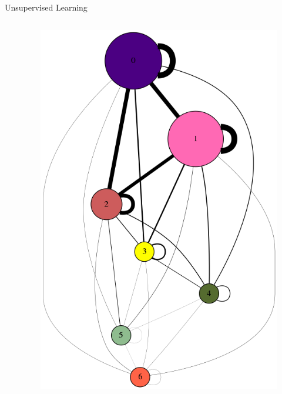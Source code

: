 \begin{frame}[t]{Unsupervised Learning}
    \begin{columns}
        \begin{column}{0.5\textwidth}
            
        \end{column}
        \begin{column}{0.5\textwidth}
        \begin{figure}[h]
        \includegraphics[scale=0.15]{img/gdot.png}
        \end{figure}
        \end{column}
    \end{columns}
\end{frame}



